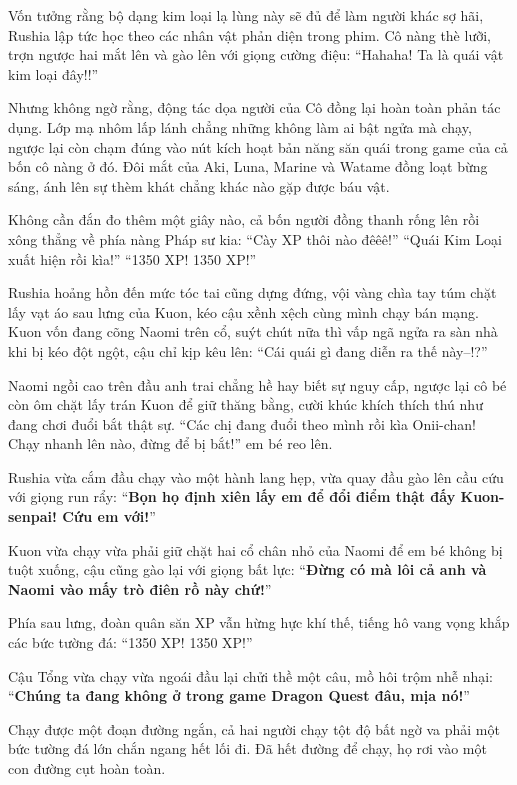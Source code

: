 \documentclass[../main.tex]{subfiles}
\begin{document}
Vốn tưởng rằng bộ dạng kim loại lạ lùng này sẽ đủ để làm người khác sợ hãi, Rushia lập tức học theo các nhân vật phản diện trong phim. Cô nàng thè lưỡi, trợn ngược hai mắt lên và gào lên với giọng cường điệu: ``Hahaha! Ta là quái vật kim loại đây!!''


Nhưng không ngờ rằng, động tác dọa người của Cô đồng lại hoàn toàn phản tác dụng. Lớp mạ nhôm lấp lánh chẳng những không làm ai bật ngửa mà chạy, ngược lại còn chạm đúng vào nút kích hoạt bản năng săn quái trong game của cả bốn cô nàng ở đó. Đôi mắt của Aki, Luna, Marine và Watame đồng loạt bừng sáng, ánh lên sự thèm khát chẳng khác nào gặp được báu vật.

Không cần đắn đo thêm một giây nào, cả bốn người đồng thanh rống lên rồi xông thẳng về phía nàng Pháp sư kia: ``Cày XP thôi nào đêêê!'' ``Quái Kim Loại xuất hiện rồi kìa!'' ``1350 XP! 1350 XP!''

Rushia hoảng hồn đến mức tóc tai cũng dựng đứng, vội vàng chìa tay túm chặt lấy vạt áo sau lưng của Kuon, kéo cậu xềnh xệch cùng mình chạy bán mạng. Kuon vốn đang cõng Naomi trên cổ, suýt chút nữa thì vấp ngã ngửa ra sàn nhà khi bị kéo đột ngột, cậu chỉ kịp kêu lên: ``Cái quái gì đang diễn ra thế này--!?''

Naomi ngồi cao trên đầu anh trai chẳng hề hay biết sự nguy cấp, ngược lại cô bé còn ôm chặt lấy trán Kuon để giữ thăng bằng, cười khúc khích thích thú như đang chơi đuổi bắt thật sự. ``Các chị đang đuổi theo mình rồi kìa Onii-chan! Chạy nhanh lên nào, đừng để bị bắt!'' em bé reo lên.

Rushia vừa cắm đầu chạy vào một hành lang hẹp, vừa quay đầu gào lên cầu cứu với giọng run rẩy: ``\textbf{Bọn họ định xiên lấy em để đổi điểm thật đấy Kuon-senpai! Cứu em với!}''

Kuon vừa chạy vừa phải giữ chặt hai cổ chân nhỏ của Naomi để em bé không bị tuột xuống, cậu cũng gào lại với giọng bất lực: ``\textbf{Đừng có mà lôi cả anh và Naomi vào mấy trò điên rồ này chứ!}''

Phía sau lưng, đoàn quân săn XP vẫn hừng hực khí thế, tiếng hô vang vọng khắp các bức tường đá: ``1350 XP! 1350 XP!''

Cậu Tổng vừa chạy vừa ngoái đầu lại chửi thề một câu, mồ hôi trộm nhễ nhại: ``\textbf{Chúng ta đang không ở trong game Dragon Quest đâu, mịa nó!}''

Chạy được một đoạn đường ngắn, cả hai người chạy tột độ bất ngờ va phải một bức tường đá lớn chắn ngang hết lối đi. Đã hết đường để chạy, họ rơi vào một con đường cụt hoàn toàn.
\end{document}
